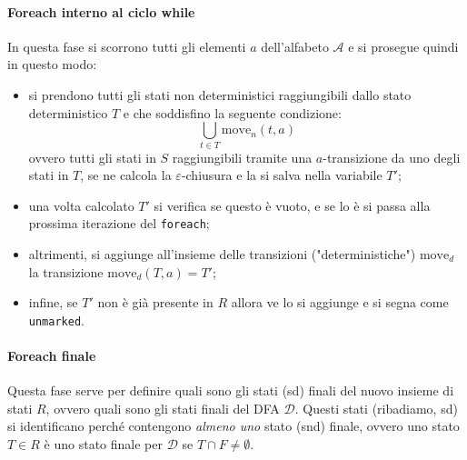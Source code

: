 \documentclass[class=book, crop=false, oneside, 12pt]{standalone}
\begin{document}
\paragraph*{Foreach interno al ciclo while}
In questa fase si scorrono tutti gli elementi \(a\) dell'alfabeto \(\mathcal{A}\) e si prosegue quindi in questo modo:
\begin{itemize}
    \item si prendono tutti gli stati non deterministici raggiungibili dallo stato deterministico \(T\) e che soddisfino la seguente condizione:
    \begin{equation*}
        \bigcup_{t \in T} \textrm{move}_n(t,a)
    \end{equation*}
    ovvero tutti gli stati in \(S\) raggiungibili tramite una \(a\)-transizione da uno degli stati in \(T\), se ne calcola la \(\varepsilon\)-chiusura e la si salva nella variabile \(T'\);
    \item una volta calcolato \(T'\) si verifica se questo è vuoto, e se lo è si passa alla prossima iterazione del \texttt{foreach};
    \item altrimenti, si aggiunge all'insieme delle transizioni ("deterministiche") \(\textrm{move}_d\) la transizione \(\textrm{move}_d(T, a) = T'\);
    \item infine, se \(T'\) non è già presente in \(R\) allora ve lo si aggiunge e si segna come \texttt{unmarked}.
\end{itemize}

\paragraph*{Foreach finale}
Questa fase serve per definire quali sono gli stati (sd) finali del nuovo insieme di stati \(R\), ovvero quali sono gli stati finali del DFA \(\mathcal{D}\). Questi stati (ribadiamo, sd) si identificano perché contengono \emph{almeno uno} stato (snd) finale, ovvero uno stato \(T \in R\) è uno stato finale per \(\mathcal{D}\) se \(T \cap F \neq \emptyset\).
\end{document}
